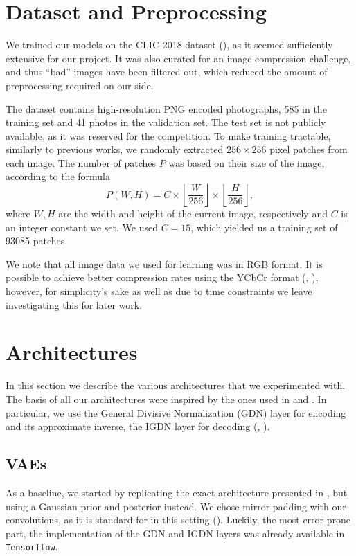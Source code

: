 \section{Dataset and Preprocessing}
\label{sec:dataset_preproc}
\par
We trained our models on the CLIC 2018 dataset (\cite{clic2018}), as it seemed
sufficiently extensive for our project. It was also curated for an image
compression challenge, and thus ``bad'' images have been
filtered out, which reduced the amount of preprocessing required on our side.
\par
The dataset contains high-resolution PNG encoded photographs, 585 in the
training set and 41 photos in the validation set. The test set is not
publicly available, as it was reserved for the competition. 
To make training tractable, similarly to previous works, we randomly extracted
$256 \times 256$ pixel patches from each image. The number of patches $P$ was
based on their size of the image, according to the formula
\[
  P(W, H) = C \times \left \lfloor \frac{W}{256} \right \rfloor \times
  \left \lfloor \frac{H}{256} \right \rfloor,
\]
where $W, H$ are the width and height of the current image, respectively and $C$
is an integer constant we set. We used $C = 15$, which yielded us a training set
of 93085 patches.
\par
We note that all image data we used for learning was in RGB format. It is
possible to achieve better compression rates using the YCbCr format
(\cite{balle2016end}, \cite{rippel2017real}), however, for simplicity's sake as
well as due to time constraints we leave investigating this for later work.
\section{Architectures}
\label{sec:architectures}
\par
In this section we describe the various architectures that we experimented with.
The basis of all our architectures were inspired by the ones used in
\cite{balle2016end} and \cite{balle2018variational}. In particular, we use the
General Divisive Normalization (GDN) layer for encoding and its approximate
inverse, the IGDN layer for decoding (\cite{balle2015density}, \cite{balle2016end}).

\subsection{VAEs}
\label{sec:method_vaes}
\par
As a baseline, we started by replicating the exact architecture
presented in \cite{balle2016end}, but using a Gaussian prior and posterior
instead. We chose mirror padding with our convolutions, as it is standard
for in this setting (\cite{theis2017lossy}). Luckily, the most
error-prone part, the implementation of the GDN and IGDN layers was already
available in \texttt{Tensorflow}\footnotemark.

